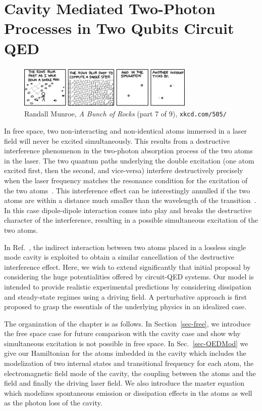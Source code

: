 


\chapter{Cavity Mediated Two-Photon Processes in Two Qubits Circuit QED} \label{ch-6}

\begin{figure}[h]
\captionsetup{labelformat=empty}
 \includegraphics[width=0.75\textwidth]{Images/xkcd/xkcd7.png}
\caption*{  Randall Munroe, \emph{A Bunch of Rocks} (part 7 of 9), \texttt{xkcd.com/505/} }
\end{figure}


In free space, two non-interacting and non-identical atoms immersed in a laser field will never be excited simultaneously. This results from a destructive interference phenomenon in the two-photon absorption process of the two atoms in the laser. The two quantum paths underlying the double excitation (one atom excited first, then the second, and vice-versa) interfere destructively precisely when the laser frequency matches the resonance condition for the excitation of the two atoms~\cite{Kim98}. This interference effect can be interestingly annulled if the two atoms are within a distance much smaller than the wavelength of the transition~\cite{Var92, Orr02, Het02}. In this case dipole-dipole interaction comes into play and breaks the destructive character of the interference, resulting in a possible simultaneous excitation of the two atoms. 

In Ref.~\cite{Kim98}, the indirect interaction between two atoms placed in a lossless single mode cavity is exploited to obtain a similar cancellation of the destructive interference effect. Here, we wish to extend significantly that initial proposal by considering the huge potentialities offered by circuit-QED systems. Our model is intended to provide realistic experimental predictions by considering dissipation and steady-state regimes using a driving field. A perturbative approach is first proposed to grasp the essentials of the underlying physics in an idealized case.

The organization of the chapter is as follows. In Section~\ref{sec-free}, we introduce the free space case for future comparison with the cavity case and show why simultaneous excitation is not possible in free space. In Sec.~\ref{sec-QEDMod} we give our Hamiltonian for the atoms imbedded in the cavity which includes the modelization of  two internal  states and transitional frequency for each atom, the electromagnetic field mode of the cavity, the coupling between the atoms and the field and finally the driving laser field. We also introduce the master equation which modelizes spontaneous emission or dissipation effects in the atoms as well as the photon loss of the cavity. 

